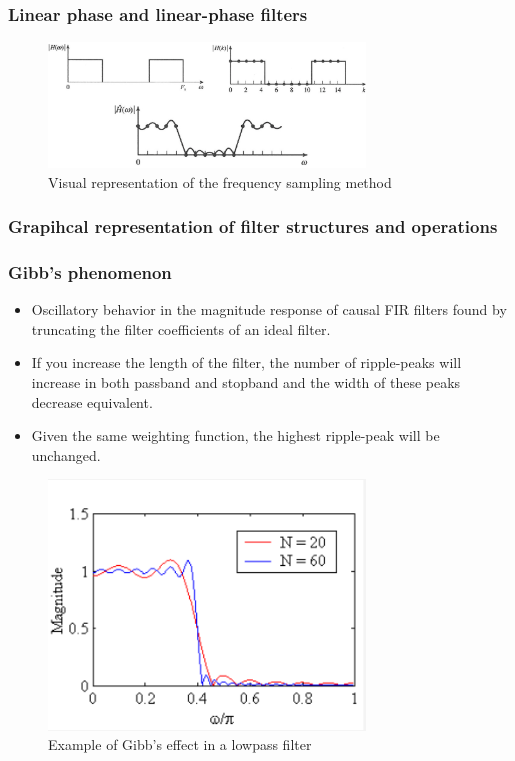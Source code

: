 \documentclass{article}
\begin{document}
\subsubsection{Linear phase and linear-phase filters}
\begin{figure}[h!]
    \centering
    \includegraphics[width=0.75\textwidth]{figures/Filter design/freq_sampling_method.png}
    \caption{Visual representation of the frequency sampling method}
    \label{fig:freq_sampling_method}
\end{figure}

\subsubsection{Grapihcal representation of filter structures and operations}

\subsubsection{Gibb's phenomenon}

\begin{itemize}
    \item Oscillatory behavior in the magnitude response of causal FIR filters found by truncating the filter coefficients of an ideal filter.
    \item If you increase the length of the filter, the number of ripple-peaks will increase in both passband and stopband and the width of these peaks decrease equivalent.
    \item Given the same weighting function, the highest ripple-peak will be unchanged. 
\end{itemize}
\begin{figure}[h!]
    \centering
    \includegraphics[width=0.75\textwidth]{figures/Filter design/gibbs_effekt.png}
    \caption{Example of Gibb's effect in a lowpass filter}
    \label{fig:gibbs_effect}
\end{figure}
\end{document}
